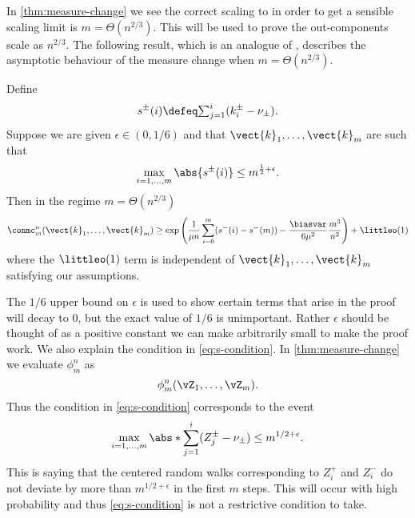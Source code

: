In \cref{thm:measure-change} we see the correct scaling to in order to get a sensible scaling limit is $m = \Theta(n^{2/3})$. This will be used to prove the out-components scale as $n^{2/3}$. The following result, which is an analogue of \cite[Lemma 6.7]{conchon--kerjanStableGraphMetric2020}, describes the asymptotic behaviour of the measure change when $m = \Theta(n^{2/3})$.
\begin{lemma}
    \label{lem:measure-change-approx}
    Define
    \begin{equation*}
        s^{\pm}(i) \defeq \textstyle{\sum_{j=1}^i (k_i^{\pm} - \nu_{\pm})}.
    \end{equation*}
    Suppose we are given $\epsilon \in (0, 1/6)$ and that $\vect{k}_1, \ldots, \vect{k}_m$ are such that
    \begin{equation}
        \label{eq:s-condition}
        \max_{i=1, \ldots, m} \abs{s^{\pm}(i)} \leq m^{\frac{1}{2} + \epsilon}.
    \end{equation}
    Then in the regime $m = \Theta(n^{2/3})$
    \begin{equation*}
        \conmc^n_m(\vect{k}_1, \ldots, \vect{k}_m)
        \geq \exp\left( \frac{1}{\mu n} \sum_{i=0}^m (s^-(i) - s^-(m)) - \frac{\biasvar}{6 \mu^2} \frac{m^3}{n^2} \right) + \littleo(1)
    \end{equation*}
    where the $\littleo(1)$ term is independent of $\vect{k}_1, \ldots, \vect{k}_m$ satisfying our assumptions.
\end{lemma}
The $1/6$ upper bound on $\epsilon$ is used to show certain terms that arise in the proof will decay to 0, but the exact value of $1/6$ is unimportant. Rather $\epsilon$ should be thought of as a positive constant we can make arbitrarily small to make the proof work. We also explain the condition in \cref{eq:s-condition}. In \cref{thm:measure-change} we evaluate $\phi^n_m$ as 
\begin{equation*}
    \phi^n_m(\vZ_1, \ldots, \vZ_m).
\end{equation*}
Thus the condition in \cref{eq:s-condition} corresponds to the event
\begin{equation*}
    \max_{i=1, \ldots, m } \abs*{
        \sum_{j=1}^i (Z^{\pm}_j - \nu_{\pm}) 
    } \leq m^{1/2 + \epsilon}.
\end{equation*}
This is saying that the centered random walks corresponding to $Z^+_i$ and $Z^-_i$ do not deviate by more than $m^{1/2 + \epsilon}$ in the first $m$ steps. This will occur with high probability and thus \cref{eq:s-condition} is not a restrictive condition to take.

